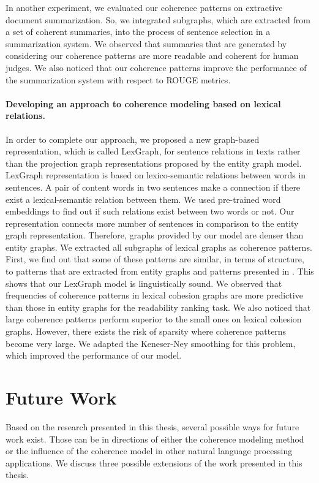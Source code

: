 In another experiment, we evaluated our coherence patterns on extractive document summarization. 
So, we integrated subgraphs, which are extracted from a set of coherent summaries, into the process of sentence selection in a summarization system. 
We observed that summaries that are generated by considering our coherence patterns are more readable and coherent for human judges. 
We also noticed that our coherence patterns improve the performance of the summarization system with respect to ROUGE metrics. 

\paragraph{Developing an approach to coherence modeling based on lexical relations.} 
In order to complete our approach, we proposed a new graph-based representation, which is called LexGraph, for sentence relations in texts rather than the projection graph representations proposed by the entity graph model.   
LexGraph representation is based on lexico-semantic relations between words in sentences.
A pair of content words in two sentences make a connection if there exist a lexical-semantic relation between them. 
We used pre-trained word embeddings to find out if such relations exist between two words or not.  
Our representation connects more number of sentences in comparison to the entity graph representation. 
Therefore, graphs provided by our model are denser than entity graphs. 
We extracted all subgraphs of lexical graphs as coherence patterns. 
First, we find out that some of these patterns are similar, in terms of structure, to patterns that are extracted from entity graphs and patterns presented in .
This shows that our LexGraph model is linguistically sound. 
We observed that frequencies of coherence patterns in lexical cohesion graphs are more predictive than those in entity graphs for the readability ranking task. 
We also noticed that large coherence patterns perform superior to the small ones on lexical cohesion graphs.  
However, there exists the risk of sparsity where coherence patterns become very large. 
We adapted the Keneser-Ney smoothing for this problem, which improved the performance of our model. 

\section{Future Work}
\label{sec:conc-future_work}

Based on the research presented in this thesis, several possible ways for future work exist. 
Those can be in directions of either the coherence modeling method or the influence of the coherence model in other natural language processing applications.   
We discuss three possible extensions of the work presented in this thesis. 

